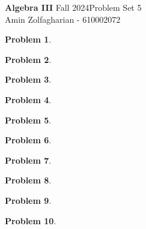 \documentclass[12pt]{article}
\newcommand{\customanswer}[1]{%
\begin{problem}
\end{problem}

}
\newtheorem{problem}{Problem}
\begin{document}
\noindent \textbf{Algebra III} Fall 2024\hfill Problem Set 5\\
Amin Zolfagharian - 610002072

\hrulefill

\customanswer{8}
\customanswer{9}
\customanswer{1}
\customanswer{3}
\customanswer{4}
\newpage
\customanswer{5}
\customanswer{6}
\customanswer{10}
\customanswer{7}
\customanswer{11}
\end{document}
